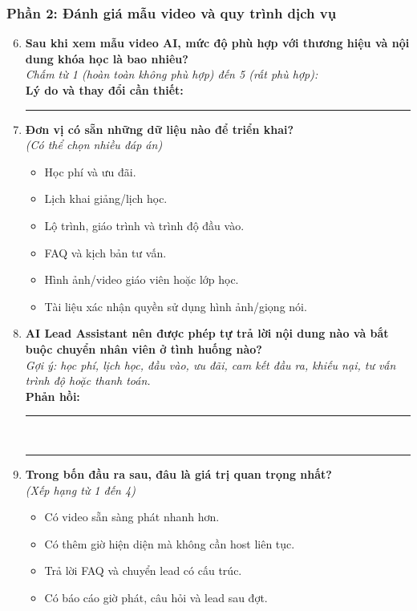 \subsubsection*{Phần 2: Đánh giá mẫu video và quy trình dịch vụ}

\begin{enumerate}
    \setcounter{enumi}{5}
    \item \textbf{Sau khi xem mẫu video AI, mức độ phù hợp với thương hiệu và
    nội dung khóa học là bao nhiêu?} \\
    \textit{Chấm từ 1 (hoàn toàn không phù hợp) đến 5 (rất phù hợp):}
         \\
    \textbf{Lý do và thay đổi cần thiết:} \rule{0.55\linewidth}{0.4pt}

    \item \textbf{Đơn vị có sẵn những dữ liệu nào để triển khai?} \\
    \textit{(Có thể chọn nhiều đáp án)}
    \begin{itemize}
        \item[$\square$] Học phí và ưu đãi.
        \item[$\square$] Lịch khai giảng/lịch học.
        \item[$\square$] Lộ trình, giáo trình và trình độ đầu vào.
        \item[$\square$] FAQ và kịch bản tư vấn.
        \item[$\square$] Hình ảnh/video giáo viên hoặc lớp học.
        \item[$\square$] Tài liệu xác nhận quyền sử dụng hình ảnh/giọng nói.
    \end{itemize}

    \item \textbf{AI Lead Assistant nên được phép tự trả lời nội dung nào và
    bắt buộc chuyển nhân viên ở tình huống nào?} \\
    \textit{Gợi ý: học phí, lịch học, đầu vào, ưu đãi, cam kết đầu ra, khiếu nại,
    tư vấn trình độ hoặc thanh toán.} \\
    \textbf{Phản hồi:} \rule{0.72\linewidth}{0.4pt} \\
    \rule{\linewidth}{0.4pt}

    \item \textbf{Trong bốn đầu ra sau, đâu là giá trị quan trọng nhất?} \\
    \textit{(Xếp hạng từ 1 đến 4)}
    \begin{itemize}
        \item[$\square$] Có video sẵn sàng phát nhanh hơn.
        \item[$\square$] Có thêm giờ hiện diện mà không cần host liên tục.
        \item[$\square$] Trả lời FAQ và chuyển lead có cấu trúc.
        \item[$\square$] Có báo cáo giờ phát, câu hỏi và lead sau đợt.
    \end{itemize}
\end{enumerate}

